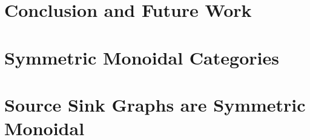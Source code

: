 \documentclass{llncs}
\begin{document}
\section{Conclusion and Future Work}
\label{sec:conclusion_and_future_work}



 

\appendix

\section{Symmetric Monoidal Categories}
\label{sec:symmetric_monoidal_categories}


\section{Source Sink Graphs are Symmetric Monoidal}
\label{sec:source_sink_graphs_are_symmetric_monoidal}

\end{document}
